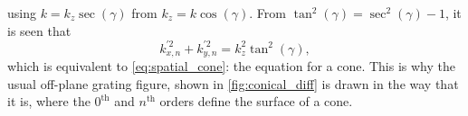 \documentclass{article}
\begin{document}
using $k = k_z \sec \left( \gamma \right)$ from $k_z = k \cos \left( \gamma \right)$. 
From $\tan^2 \left( \gamma \right) = \sec^2 \left( \gamma \right) - 1$, it is seen that 
\begin{equation}\label{eq:wave_mag3}
    k^{'2}_{x,n} + k^{'2}_{y,n} = k_z^2 \tan^2 \left( \gamma \right) ,
\end{equation}
which is equivalent to \cref{eq:spatial_cone}: the equation for a cone.
This is why the usual off-plane grating figure, shown in \cref{fig:conical_diff} is drawn in the way that it is, where the $0^{\text{th}}$ and $n^{\text{th}}$ orders define the surface of a cone.
\end{document}

